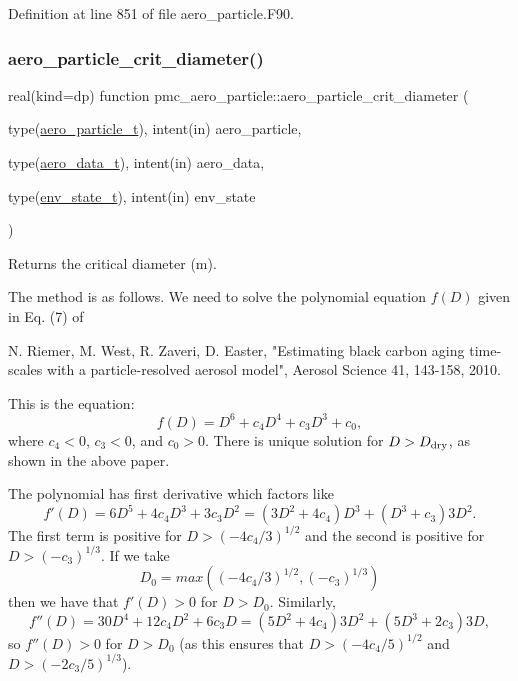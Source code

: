 Definition at line 851 of file aero\+\_\+particle.\+F90.

\mbox{\label{namespacepmc__aero__particle_a34bb7e8e2a2ff359f0e638c74486c73d}} 
\subsubsection{\texorpdfstring{aero\+\_\+particle\+\_\+crit\+\_\+diameter()}{aero\_particle\_crit\_diameter()}}
{\footnotesize\ttfamily real(kind=dp) function pmc\+\_\+aero\+\_\+particle\+::aero\+\_\+particle\+\_\+crit\+\_\+diameter (\begin{DoxyParamCaption}\item[{type(\mbox{\hyperlink{structpmc__aero__particle_1_1aero__particle__t}{aero\+\_\+particle\+\_\+t}}), intent(in)}]{aero\+\_\+particle,  }\item[{type(\mbox{\hyperlink{structpmc__aero__data_1_1aero__data__t}{aero\+\_\+data\+\_\+t}}), intent(in)}]{aero\+\_\+data,  }\item[{type(\mbox{\hyperlink{structpmc__env__state_1_1env__state__t}{env\+\_\+state\+\_\+t}}), intent(in)}]{env\+\_\+state }\end{DoxyParamCaption})}



Returns the critical diameter (m). 

The method is as follows. We need to solve the polynomial equation $f(D)$ given in Eq. (7) of

N. Riemer, M. West, R. Zaveri, D. Easter, "Estimating black carbon aging time-\/scales with a particle-\/resolved aerosol model", Aerosol Science 41, 143-\/158, 2010.

This is the equation\+: \[ f(D) = D^6 + c_4 D^4 + c_3 D^3 + c_0, \] where $c_4 < 0$, $c_3 < 0$, and $c_0 > 0$. There is unique solution for $D > D_{\rm dry}$, as shown in the above paper.

The polynomial has first derivative which factors like \[ f'(D) = 6 D^5 + 4 c_4 D^3 + 3 c_3 D^2 = (3 D^2 + 4 c_4) D^3 + (D^3 + c_3) 3 D^2. \] The first term is positive for $D > (-4 c_4 / 3)^{1/2}$ and the second is positive for $D > (-c_3)^{1/3}$. If we take \[ D_0 = max((-4 c_4 / 3)^{1/2}, (-c_3)^{1/3}) \] then we have that $f'(D) > 0$ for $D > D_0$. Similarly, \[ f''(D) = 30 D^4 + 12 c_4 D^2 + 6 c_3 D = (5 D^2 + 4 c_4) 3 D^2 + (5 D^3 + 2 c_3) 3 D, \] so $f''(D) > 0$ for $D > D_0$ (as this ensures that $D > (-4 c_4 / 5)^{1/2}$ and $D > (-2 c_3 / 5)^{1/3}$).

